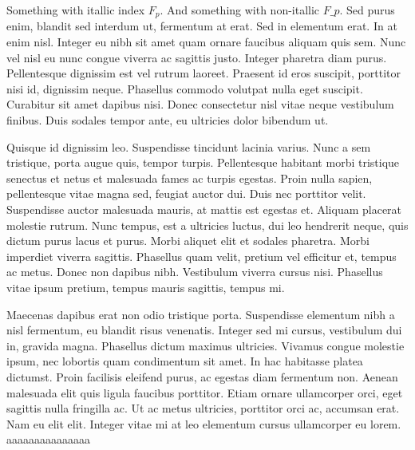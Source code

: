 Something with itallic index $F_p$. And something with non-itallic $F\_p$. Sed purus enim, blandit sed interdum ut, fermentum at erat. Sed in elementum erat. In at enim nisl. Integer eu nibh sit amet quam ornare faucibus aliquam quis sem. Nunc vel nisl eu nunc congue viverra ac sagittis justo. Integer pharetra diam purus. Pellentesque dignissim est vel rutrum laoreet. Praesent id eros suscipit, porttitor nisi id, dignissim neque. Phasellus commodo volutpat nulla eget suscipit. Curabitur sit amet dapibus nisi. Donec consectetur nisl vitae neque vestibulum finibus. Duis sodales tempor ante, eu ultricies dolor bibendum ut.

Quisque id dignissim leo. Suspendisse tincidunt lacinia varius. Nunc a sem tristique, porta augue quis, tempor turpis. Pellentesque habitant morbi tristique senectus et netus et malesuada fames ac turpis egestas. Proin nulla sapien, pellentesque vitae magna sed, feugiat auctor dui. Duis nec porttitor velit. Suspendisse auctor malesuada mauris, at mattis est egestas et. Aliquam placerat molestie rutrum. Nunc tempus, est a ultricies luctus, dui leo hendrerit neque, quis dictum purus lacus et purus. Morbi aliquet elit et sodales pharetra. Morbi imperdiet viverra sagittis. Phasellus quam velit, pretium vel efficitur et, tempus ac metus. Donec non dapibus nibh. Vestibulum viverra cursus nisi. Phasellus vitae ipsum pretium, tempus mauris sagittis, tempus mi.

Maecenas dapibus erat non odio tristique porta. Suspendisse elementum nibh a nisl fermentum, eu blandit risus venenatis. Integer sed mi cursus, vestibulum dui in, gravida magna. Phasellus dictum maximus ultricies. Vivamus congue molestie ipsum, nec lobortis quam condimentum sit amet. In hac habitasse platea dictumst. Proin facilisis eleifend purus, ac egestas diam fermentum non. Aenean malesuada elit quis ligula faucibus porttitor. Etiam ornare ullamcorper orci, eget sagittis nulla fringilla ac. Ut ac metus ultricies, porttitor orci ac, accumsan erat. Nam eu elit elit. Integer vitae mi at leo elementum cursus ullamcorper eu lorem. aaaaaaaaaaaaaaa

